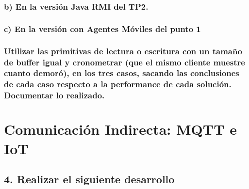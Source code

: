 \documentclass[11pt]{article}
\begin{document}
    \hypertarget{b-en-la-versiuxf3n-java-rmi-del-tp2.}{%
\subsubsection{b) En la versión Java RMI del
TP2.}\label{b-en-la-versiuxf3n-java-rmi-del-tp2.}}

    \hypertarget{c-en-la-versiuxf3n-con-agentes-muxf3viles-del-punto-1}{%
\subsubsection{c) En la versión con Agentes Móviles del punto
1}\label{c-en-la-versiuxf3n-con-agentes-muxf3viles-del-punto-1}}

    \hypertarget{utilizar-las-primitivas-de-lectura-o-escritura-con-un-tamauxf1o-de-buffer-igual-y-cronometrar-que-el-mismo-cliente-muestre-cuanto-demoruxf3-en-los-tres-casos-sacando-las-conclusiones-de-cada-caso-respecto-a-la-performance-de-cada-soluciuxf3n.-documentar-lo-realizado.}{%
\subsubsection{Utilizar las primitivas de lectura o escritura con un
tamaño de buffer igual y cronometrar (que el mismo cliente muestre
cuanto demoró), en los tres casos, sacando las conclusiones de cada caso
respecto a la performance de cada solución. Documentar lo
realizado.}\label{utilizar-las-primitivas-de-lectura-o-escritura-con-un-tamauxf1o-de-buffer-igual-y-cronometrar-que-el-mismo-cliente-muestre-cuanto-demoruxf3-en-los-tres-casos-sacando-las-conclusiones-de-cada-caso-respecto-a-la-performance-de-cada-soluciuxf3n.-documentar-lo-realizado.}}

    \hypertarget{comunicaciuxf3n-indirecta-mqtt-e-iot}{%
\section{Comunicación Indirecta: MQTT e
IoT}\label{comunicaciuxf3n-indirecta-mqtt-e-iot}}

    \hypertarget{realizar-el-siguiente-desarrollo}{%
\subsection{4. Realizar el siguiente
desarrollo}\label{realizar-el-siguiente-desarrollo}}
\end{document}
